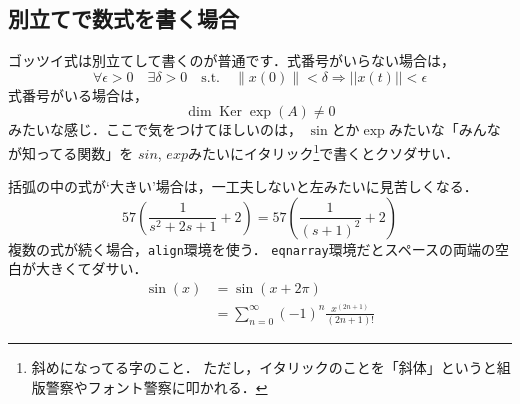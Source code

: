   \subsection{別立てで数式を書く場合}
    ゴッツイ式は別立てして書くのが普通です．式番号がいらない場合は，
      \[
        \forall \epsilon > 0 \quad \exists \delta > 0 \quad
        \text{s.t.} \quad
          \|x(0)\| < \delta \Rightarrow ||x(t)|| < \epsilon
      \]
    式番号がいる場合は，
      \begin{equation}
        \operatorname{dim}\operatorname{Ker}
          \exp(A) \neq 0
      \end{equation}
    みたいな感じ．ここで気をつけてほしいのは，
    $\sin$とか$\exp$みたいな「みんなが知ってる関数」を
    $sin$, $exp$みたいにイタリック\footnote{斜めになってる字のこと．
      ただし，イタリックのことを「斜体」というと組版警察やフォント警察に叩かれる．}で書くとクソダサい．
    \par 括弧の中の式が`大きい'場合は，一工夫しないと左みたいに見苦しくなる．
      \begin{equation}
        57(\frac{1}{s^2 + 2s + 1} + 2) =57\left(\frac{1}{(s + 1)^2} + 2 \right)
      \end{equation}
    複数の式が続く場合，\texttt{align}環境を使う．
    \texttt{eqnarray}環境だとスペースの両端の空白が大きくてダサい．
      \begin{align}
        \sin(x) &= \sin(x + 2\pi) \\
        &= \sum_{n = 0}^{\infty} (-1)^{n}\frac{x^{(2n + 1)}}{(2n + 1)!}
      \end{align}
